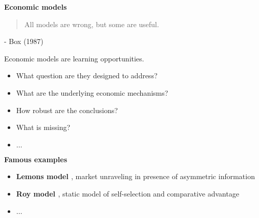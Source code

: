 \begin{frame}\begin{center}
		\LARGE\textbf{Economic models}
\end{center}\end{frame}
\begin{frame}\begin{quote}
All models are wrong, but some are useful.
\end{quote}\vspace{-0.5pt} \hspace{6cm} - Box (1987)
\end{frame}
\begin{frame}
Economic models are learning opportunities.\vspace{0.3cm}
\begin{itemize}\setlength\itemsep{1em}
\item What question are they designed to address?
\item What are the underlying economic mechanisms?
\item How robust are the conclusions?
\item What is missing?
\item $\hdots$
\end{itemize}

\end{frame}
\begin{frame}\textbf{Famous examples}\vspace{0.3cm}

\begin{itemize}\setlength\itemsep{1em}
\item \textbf{Lemons model \cite{Akerlof.1970}}, market unraveling in presence of asymmetric information
\item \textbf{Roy model \cite{Roy.1951}}, static model of self-selection and comparative advantage
\item $\hdots$
\end{itemize}

\end{frame}
